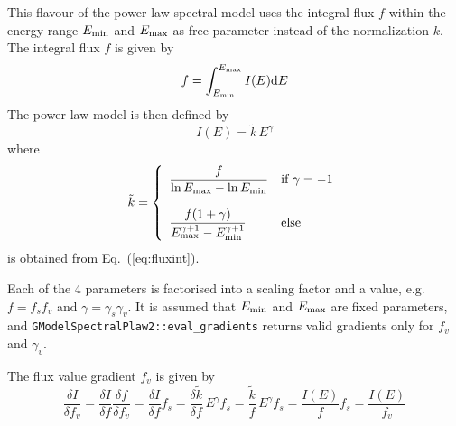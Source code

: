 \documentclass{article}[12pt,a4]
\begin{document}
This flavour of the power law spectral model uses the integral flux $f$ within the
energy range $E_{\rm min}$ and $E_{\rm max}$ as free parameter instead of
the normalization $k$.
The integral flux $f$ is given by
\begin{equation}
f = \int_{E_{\rm min}}^{E_{\rm max}} I(E) {\rm d}E
\label{eq:fluxint}
\end{equation}
The power law model is then defined by
\begin{equation}
I(E) = \tilde{k} \, E^{\gamma}
\end{equation}
where
\begin{equation}
   \tilde{k} = \left \{
   \begin{array}{l l}
      \displaystyle
      \frac{f}{\ln E_{\rm max} - \ln E_{\rm min}} 
        & \mbox{if $\gamma = -1$} \\
     \\
     \displaystyle
      \frac{f (1+\gamma)}{E_{\rm max}^{\gamma+1}-E_{\rm min}^{\gamma+1}} 
        & \mbox{else}
   \end{array}
   \right .
\end{equation}
is obtained from Eq.~(\ref{eq:fluxint}).

Each of the 4 parameters is factorised into a scaling factor and a value, e.g.
$f=f_s f_v$ and $\gamma=\gamma_s \gamma_v$.
It is assumed that $E_{\rm min}$ and $E_{\rm max}$ are fixed parameters,
and {\tt GModelSpectralPlaw2::eval\_gradients} returns valid gradients only for 
$f_v$ and $\gamma_v$.

The flux value gradient $f_v$ is given by
\begin{equation}
\frac{\delta I}{\delta f_v} = 
  \frac{\delta I}{\delta f} \frac{\delta f}{\delta f_v} = 
  \frac{\delta I}{\delta f} f_s = 
  \frac{\delta \tilde{k}}{\delta f} \, E^{\gamma} f_s = 
  \frac{\tilde{k}}{f} \, E^{\gamma} f_s = 
  \frac{I(E)}{f} f_s =
  \frac{I(E)}{f_v}
\end{equation}
\end{document}
